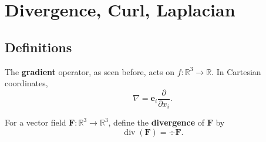 \section{Divergence, Curl, Laplacian}
\subsection{Definitions}
\begin{definition}[Gradient]
    The \textbf{gradient} operator, as seen before, acts on $ f:\mathbb{R}^{3}\to \mathbb{R}  $. In Cartesian coordinates,
    \[
        \nabla  = \mathbf{e}_i \frac{\partial }{\partial x_i}. 
    \]
\end{definition}
\begin{definition}[Divergence]
    For a vector field $ \mathbf{F}: \mathbb{R}^{3}\to \mathbb{R}^{3} $, define the \textbf{divergence} of $\mathbf{F}$ by 
    \[
        \operatorname{div} (\mathbf{F}) = \div \mathbf{F}.
    \]
\end{definition}

